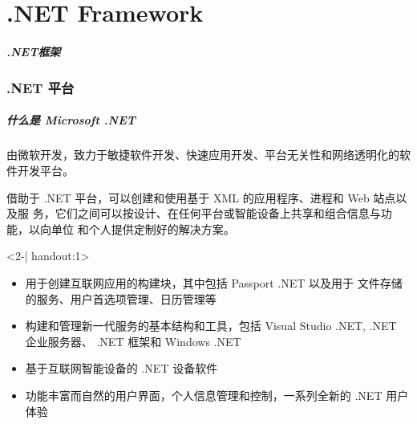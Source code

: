
\part{.NET Framework}

\begin{frame}
\frametitle{.NET框架}
\tableofcontents
\end{frame}

\section{.NET 平台}
\begin{frame}
\frametitle{什么是 Microsoft .NET}

\CJKindent 由微软开发，致力于敏捷软件开发、快速应用开发、平台无关性和网络透明化的软件开发平台。

\smallskip

借助于 .NET 平台，可以创建和使用基于 XML 的应用程序、进程和 Web 站点以及服
务，它们之间可以按设计、在任何平台或智能设备上共享和组合信息与功能，以向单位
和个人提供定制好的解决方案。



\begin{uncoverenv}<2-| handout:1>

  \begin{itemize}
  \item 用于创建互联网应用的构建块，其中包括 Passport .NET 以及用于
    文件存储的服务、用户首选项管理、日历管理等
  \item 构建和管理新一代服务的基本结构和工具，包括 Visual Studio .NET, .NET
    企业服务器、 .NET 框架和 Windows .NET
  \item 基于互联网智能设备的 .NET 设备软件
  \item 功能丰富而自然的用户界面，个人信息管理和控制，一系列全新的 .NET 用户
    体验
  \end{itemize}
\end{uncoverenv}


\end{frame}


